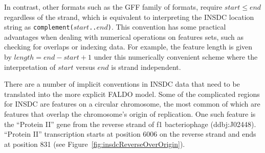 In contrast, other formats such as the GFF family of formats, require $start \leq end$
regardless of the strand, which is equivalent to interpreting
the INSDC location string as \texttt{complement($start$..$end$)}.
This convention has some practical advantages when
dealing with numerical operations on features sets, such as
checking for overlaps or indexing data. For example, the
feature length is given by $length = end - start + 1$ under
this numerically convenient scheme where the interpretation
of $start$ versus $end$ is strand independent.

There are a number of implicit conventions in INSDC data that need to be translated into the more explicit FALDO model.
Some of the complicated regions for INSDC are features on a circular chromosome, the most common of which are features that overlap the chromosome's origin of replication.
One such feature is the ``Protein II'' gene from the reverse strand of f1 bacteriophage (ddbj:J02448).
``Protein II'' transcription starts at position 6006 on the reverse strand and ends at position 831 (see Figure~\ref{fig:insdcReverseOverOrigin}).


